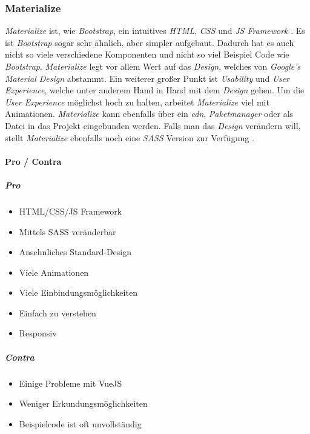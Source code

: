 		\subsubsection{Materialize}
		\label{chapter:study-frontend-frameworks-materialize}
		\textit{Materialize} ist, wie \textit{Bootstrap}, ein intuitives \textit{HTML}, \textit{CSS} und \textit{JS Framework} \cite{materialize-intro}. Es ist \textit{Bootstrap} sogar sehr ähnlich, aber simpler aufgebaut. Dadurch hat es auch nicht so viele verschiedene Komponenten und nicht so viel Beispiel Code wie \textit{Bootstrap}. \textit{Materialize} legt vor allem Wert auf das \textit{Design}, welches von\textit{ Google's Material Design} abstammt. Ein weiterer großer Punkt ist \textit{Usability} und \textit{User Experience}, welche unter anderem Hand in Hand mit dem \textit{Design} gehen. Um die \textit{User Experience} möglichst hoch zu halten, arbeitet \textit{Materialize} viel mit Animationen. \textit{Materialize} kann ebenfalls über ein \textit{\Gls{cdn}}, \textit{Paketmanager} oder als Datei in das Projekt eingebunden werden. Falls man das \textit{Design} verändern will, stellt \textit{Materialize} ebenfalls noch eine \textit{SASS} Version zur Verfügung \cite{WebDocMaterialize}.
		\paragraph{Pro / Contra}
		\subparagraph{Pro}
		\begin{itemize}
			\item HTML/CSS/JS Framework
			\item Mittels SASS veränderbar
			\item Ansehnliches Standard-Design 
			\item Viele Animationen
			\item Viele Einbindungsmöglichkeiten
			\item Einfach zu verstehen
			\item Responsiv
		\end{itemize}
	\label{list:materializepro}
		\subparagraph{Contra}
		\begin{itemize}
			\item Einige Probleme mit VueJS
			\item Weniger Erkundungsmöglichkeiten
			\item Beispielcode ist oft unvollständig
		\end{itemize}
	\label{list:materializecontra}
	

